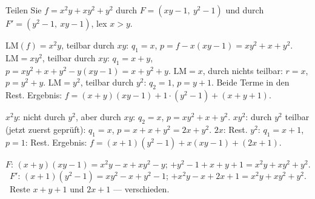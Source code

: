 \begin{aufgabe}
Teilen Sie $f = x^{2}y + xy^{2} + y^{2}$ durch $F = (xy - 1,\ y^{2} - 1)$ und durch $F' = (y^{2} - 1,\ xy - 1)$, lex $x > y$.

\loesung
{}
$\mathrm{LM}(f) = x^{2}y$, teilbar durch $xy$: $q_1 = x$, $p = f - x(xy - 1) = xy^{2} + x + y^{2}$. $\mathrm{LM} = xy^{2}$, teilbar durch $xy$: $q_1 = x + y$, $p = xy^{2} + x + y^{2} - y(xy - 1) = x + y^{2} + y$. $\mathrm{LM} = x$, durch nichts teilbar: $r = x$, $p = y^{2} + y$. $\mathrm{LM} = y^{2}$, teilbar durch $y^{2}$: $q_2 = 1$, $p = y + 1$. Beide Terme in den Rest. Ergebnis: $f = (x + y)(xy - 1) + 1\cdot(y^{2} - 1) + (x + y + 1)$.

$x^{2}y$: nicht durch $y^{2}$, aber durch $xy$: $q_2 = x$, $p = xy^{2} + x + y^{2}$. $xy^{2}$: durch $y^{2}$ teilbar (jetzt zuerst geprüft): $q_1 = x$, $p = x + x + y^{2} = 2x + y^{2}$. $2x$: Rest. $y^{2}$: $q_1 = x + 1$, $p = 1$: Rest. Ergebnis: $f = (x + 1)(y^{2} - 1) + x(xy - 1) + (2x + 1)$.

$F$: $(x + y)(xy - 1) = x^{2}y - x + xy^{2} - y$; $+ y^{2} - 1 + x + y + 1 = x^{2}y + xy^{2} + y^{2}$. \checkmark\ $F'$: $(x + 1)(y^{2} - 1) = xy^{2} - x + y^{2} - 1$; $+ x^{2}y - x + 2x + 1 = x^{2}y + xy^{2} + y^{2}$. \checkmark\ Reste $x + y + 1$ und $2x + 1$ --- verschieden.

\begin{center}
\begin{minipage}{0.88\textwidth}
\end{minipage}
\end{center}
\end{aufgabe}

